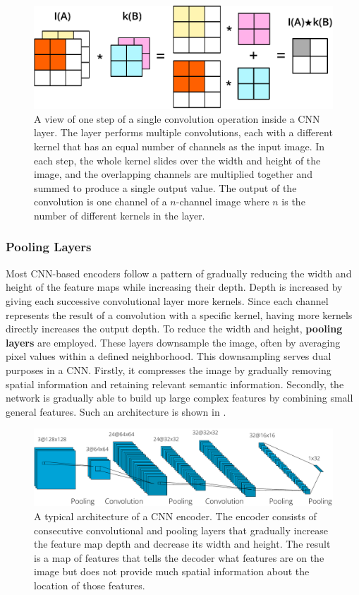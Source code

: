 \begin{figure}[t!]
 \centering
 \includegraphics[width=0.8\linewidth]{images/cnn-operation-explained}
 \caption{A view of one step of a single convolution operation inside a CNN layer. The layer performs multiple convolutions, each with a different kernel that has an equal number of channels as the input image. In each step, the whole kernel slides over the width and height of the image, and the overlapping channels are multiplied together and summed to produce a single output value. The output of the convolution is one channel of a $n$-channel image where $n$ is the number of different kernels in the layer.}
 \label{fig:cnn-conv-explained}
 \end{figure}
 
\subsubsection{Pooling Layers}

Most CNN-based encoders follow a pattern of gradually reducing the width and height of the feature maps while increasing their depth. Depth is increased by giving each successive convolutional layer more kernels. Since each channel represents the result of a convolution with a specific kernel, having more kernels directly increases the output depth. To reduce the width and height, \textbf{pooling layers} are employed. These layers downsample the image, often by averaging pixel values within a defined neighborhood. This downsampling serves dual purposes in a CNN. Firstly, it compresses the image by gradually removing spatial information and retaining relevant semantic information. Secondly, the network is gradually able to build up large complex features by combining small general features. Such an architecture is shown in .

\begin{figure}[b!]
 \centering
 \includegraphics[width=\linewidth]{images/cnn_encoder_example.pdf}
 \caption{A typical architecture of a CNN encoder. The encoder consists of consecutive convolutional and pooling layers that gradually increase the feature map depth and decrease its width and height. The result is a map of features that tells the decoder what features are on the image but does not provide much spatial information about the location of those features. \cite{lecunGradientbasedLearningApplied1998}}
 \label{fig:cnn-encoder-achitecture}
 \end{figure}

